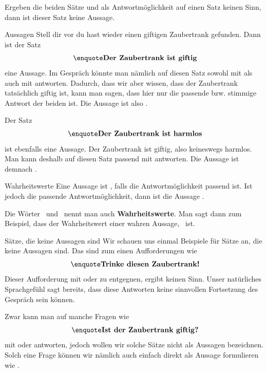 \documentclass[../../main.tex]{subfiles}
\begin{document}
    Ergeben die beiden Sätze   und 
    als 
    Antwortmöglichkeit auf einen Satz keinen Sinn, dann ist dieser Satz keine 
    Aussage.
    \begin{example}{Aussagen}
        Stell dir vor du hast wieder einen giftigen Zaubertrank gefunden. Dann ist der Satz
        \[\textrm{ \statement{Der Zaubertrank ist giftig}}\]
        eine Aussage.
        Im Gespräch könnte man nämlich auf diesen Satz sowohl mit   als auch mit   antworten. 
        Dadurch, dass wir aber wissen, dass der Zaubertrank tatsächlich giftig ist, kann man sagen, dass hier nur   die passende bzw. stimmige 
        Antwort der beiden ist. Die Aussage ist also \wahr.
        
        Der Satz
        \[\textrm{ \statement{Der Zaubertrank ist harmlos}}\]
        ist ebenfalls eine Aussage. Der Zaubertrank ist giftig, also keineswegs harmlos. Man kann deshalb auf diesen Satz passend mit   antworten. 
        Die Aussage ist demnach \falsch.
    \end{example}

    \begin{definition}{Wahrheitswerte}
        Eine Aussage ist \wahr, falls die Antwortmöglichkeit 
        passend ist. Ist jedoch  die passende
        Antwortmöglichkeit, dann ist die Aussage \falsch.
    \end{definition}

    Die Wörter \falsch\  und \wahr\  nennt
    man auch \textbf{Wahrheitswerte}. Man sagt dann zum Beispiel, dass der Wahrheitswert einer wahren
    Aussage, \wahr\  ist.
    

    \begin{example}{Sätze, die keine Aussagen sind}
        Wir schauen uns einmal Beispiele für Sätze an, die keine Aussagen sind. Das sind zum einen Aufforderungen wie
        \[\textrm{ \statement{Trinke diesen Zaubertrank!}}\]
        Dieser Aufforderung mit   oder   zu entgegnen, ergibt keinen Sinn. Unser natürliches Sprachgefühl sagt bereits, dass diese Antworten keine sinnvollen Fortsetzung des Gespräch sein können.
        
        Zwar kann man auf manche Fragen wie
         \[\textrm{ \statement{Ist der Zaubertrank giftig?}}\]
        mit   oder   antworten, jedoch wollen wir solche Sätze nicht als Aussagen bezeichnen. Solch eine Frage können wir nämlich auch einfach direkt als Aussage formulieren wie
         .
    \end{example}
\end{document}
